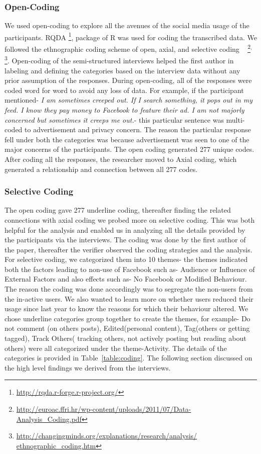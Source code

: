 \subsubsection{Open-Coding}
We used open-coding to explore all the avenues of the social media usage of the participants. RQDA \footnote{\url{http://rqda.r-forge.r-project.org/}}, package of R was used for coding the transcribed data. We followed the ethnographic coding scheme of open, axial, and selective coding ~\cite{glaser1968discovery} \footnote{\url{http://euroac.ffri.hr/wp-content/uploads/2011/07/Data-Analysis_Coding.pdf}}$^{,}$\footnote{\url{http://changingminds.org/explanations/research/analysis/ ethnographic_coding.htm}}. Open-coding of the semi-structured interviews helped the first author in labeling and defining the categories based on the interview data without any prior assumption of the responses. During open-coding, all of the responses were coded word for word to avoid any loss of data. For example, if the participant mentioned- \textit{I am sometimes creeped out. If I search something, it pops out in my feed. I know they pay money to Facebook to feature their ad. I am not majorly concerned but sometimes it creeps me out.}- this particular sentence was multi-coded to advertisement and privacy concern. The reason the particular response fell under both the categories was because advertisement was seen to one of the major concerns of the participants. The open coding generated 277 unique codes. After coding all the responses, the researcher moved to Axial coding, which generated a relationship and connection between all 277 codes.
\subsubsection{Selective Coding}
The open coding gave 277 underline coding, thereafter finding the related connections with axial coding we probed more on selective coding. This was both helpful for the analysis and enabled us in analyzing all the details provided by the participants via the interviews. The coding was done by the first author of the paper, thereafter the verifier observed the coding strategies and the analysis. For selective coding, we categorized them into 10 themes- the themes indicated both the factors leading to non-use of Facebook such as- Audience or Influence of External Factors and also effects such as- No Facebook or Modified Behaviour. The reason the coding was done accordingly was to segregate the non-users from the in-active users. We also wanted to learn more on whether users reduced their usage since last year to know the reasons for which their behaviour altered. 
We chose underline categories group together to create the themes, for example- Do not comment (on others posts), Edited(personal content), Tag(others or getting tagged), Track Others( tracking others, not actively posting but reading about others) were all categorized under the theme-Activity. The details of the categories is provided in Table~\ref{table:coding}. 
The following section discussed on the high level findings we derived from the interviews. 